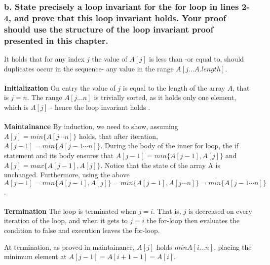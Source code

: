\documentclass[11pt,english]{article}
\begin{document}
\subsubsection*{b. \mdseries State precisely a loop invariant for the
\textbf{for} loop in lines 2-4, and prove that this loop invariant holds. Your
proof should use the structure of the loop invariant proof presented in this
chapter.}
It holds that for any index $j$ the value of $A[j]$ is less than -or equal to,
should duplicates occur in the sequence- any value in the range
$A[j \dots A.length]$.
\\\\
\textbf{Initialization} \mdseries On entry the value of $j$ is equal to the
length of the array $A$, that is $j = n$. The range $A[j \dots n]$ is
trivially sorted, as it holds only one element, which is $A[j]$ - hence the
loop invariant holds .
\\\\
\textbf{Maintainance} \mdseries By induction, we need to show, assuming
$A[j] = min\{A[j \cdots n]\}$ holds, that after iteration, $A[j-1] = min\{
A[j-1 \cdots n]\}$. During the body of the inner for loop, the if
statement and its body ensures that $A[j-1] = min\{A[j-1],A[j]\}$ and $A[j] 
= max\{A[j-1],A[j]\}$. Notice that the state of the array A is unchanged.
Furthermore, using the above $A[j-1] = min\{A[j-1],A[j]\} = min\{A[j-1],
A[j \cdots n]\} = min\{A[j-1 \cdots n]\}$.
\\\\
\textbf{Termination} \mdseries The loop is terminated when $j = i$. That is,
$j$ is decreased on every iteration of the loop, and when it gets to
$j = i$ the for-loop then evaluates the condition to false and execution
leaves the for-loop.

At termination, as proved in maintainance, $A[j]$ holds $min{A[i \dots n]}$,
placing the minimum element at $A[j - 1] = A[i + 1 - 1] = A[i]$.
\end{document}

